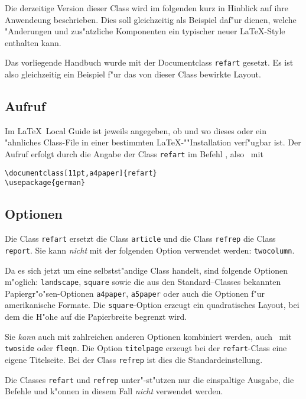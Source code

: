 Die derzeitige Version dieser Class wird im folgenden kurz in Hinblick 
auf ihre Anwendeung beschrieben. Dies soll gleichzeitig als Beispiel 
daf"ur dienen, welche "Anderungen und zus"atzliche Komponenten ein 
typischer neuer \LaTeX-Style enthalten kann.

Das vorliegende Handbuch wurde mit der Documentclass 
\texttt{refart} gesetzt. Es ist also gleichzeitig ein Beispiel 
f"ur das von dieser Class bewirkte Layout.


\subsection{Aufruf}

Im \LaTeX\ Local Guide ist jeweils angegeben, ob und wo dieses oder 
ein "ahnliches Class-File in einer bestimmten 
\LaTeX-""Installation verf"ugbar ist. Der Aufruf erfolgt durch die 
Angabe der Class \texttt{refart} im Befehl , 
also \zB~mit
\begin{verbatim}
\documentclass[11pt,a4paper]{refart}
\usepackage{german}
\end{verbatim}

\subsection{Optionen}

Die Class \texttt{refart} ersetzt die Class \texttt{article} und 
die Class \texttt{refrep} die Class \texttt{report}. Sie kann 
\emph{nicht} mit der folgenden Option verwendet werden:
\texttt{twocolumn}.

Da es sich jetzt um eine selbstst"andige Class handelt, sind folgende 
Optionen m"oglich:
\texttt{landscape},
\texttt{square}
sowie die aus den Standard--Classes bekannten 
Papiergr"o"sen-Optionen
\texttt{a4paper},
\texttt{a5paper} oder auch die Optionen f"ur amerikanische 
Formate. Die \texttt{square}-Option erzeugt ein quadratisches 
Layout, bei dem die H"ohe auf die Papierbreite begrenzt wird.

Sie \emph{kann} auch mit zahlreichen anderen Optionen kombiniert 
werden, auch \zB\ mit \texttt{twoside} oder \texttt{fleqn}. Die 
Option \texttt{titelpage} erzeugt bei der \texttt{refart}-Class 
eine eigene Titelseite. Bei der Class \texttt{refrep} ist dies 
die Standardeinstellung.

Die Classes \texttt{refart} und \texttt{refrep} unter"-st"utzen nur 
die einspaltige Ausgabe, die Befehle  und 
 k"onnen in diesem Fall \emph{nicht} verwendet 
werden.

